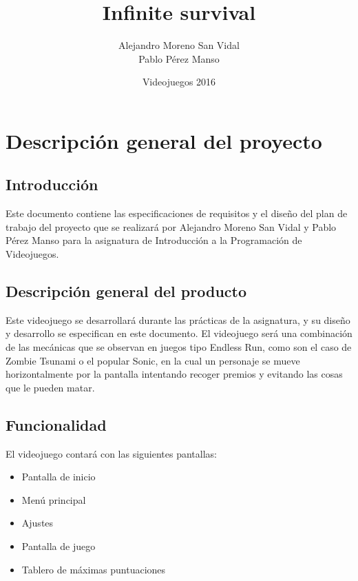 \documentclass[palatino]{apuntes}
\title{Infinite survival}
\author{Alejandro Moreno San Vidal \\ Pablo Pérez Manso}
\date{Videojuegos 2016}
\begin{document}
\pagestyle{plain}
\maketitle
\tableofcontents
\newpage

\chapter{Descripción general del proyecto}

\section{Introducción}
Este documento contiene las especificaciones de requisitos y el diseño del plan de trabajo del proyecto que se realizará por Alejandro Moreno San Vidal y Pablo Pérez Manso para la asignatura de Introducción a la Programación de Videojuegos.

\section{Descripción general del producto}
Este videojuego se desarrollará durante las prácticas de la asignatura, y su diseño y desarrollo se especifican en este documento. El videojuego será una combinación de las mecánicas que se observan en juegos tipo Endless Run, como son el caso de Zombie Tsunami o el popular Sonic, en la cual un personaje se mueve horizontalmente por la pantalla intentando recoger premios y evitando las cosas que le pueden matar.

\section{Funcionalidad}

El videojuego contará con las siguientes pantallas:
\begin{itemize}
    \item Pantalla de inicio
    \item Menú principal
    \item Ajustes
    \item Pantalla de juego
    \item Tablero de máximas puntuaciones
\end{itemize}
\end{document}
